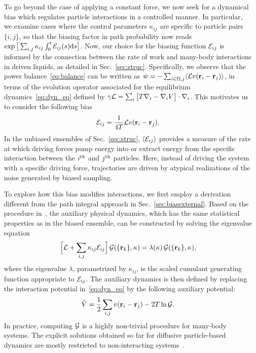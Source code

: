 \documentclass[superscriptaddress, twocolumn, prx, longbibliography, nofootinbib]{revtex4-1}
\begin{document}
To go beyond the case of applying a constant force, we now seek for a dynamical bias which regulates particle interactions in a controlled manner. In particular, we examine cases where the control parameters $\kappa_{ij}$ are specific to particle pairs $\{i,j\}$, so that the biasing factor in path probability now reads $\exp\big[\sum_{i,j}\kappa_{ij}\int_0^t{\cal E}_{ij}(s){\rm d}s\big]$. {Now}, our choice for the biasing function ${\cal E}_{ij}$ is informed by the connection between the rate of work and many-body interactions in driven liquids, as detailed in Sec.~\ref{sec:struc}. { Specifically, we observe that the power balance~\eqref{eq:balance} can be written as $\dot w = - \sum_{i\in\Omega,j} \langle{\cal L} v({\bf r}_i-{\bf r}_j)\rangle$, in terms of the evolution operator associated for the equilibrium dynamics~\eqref{eq:dyn_eq} defined by $\gamma{\cal L} = \sum_i\big[ T \nabla_i - \nabla_i V\big] \cdot\nabla_i $. This motivates us to consider the following bias}
\begin{equation}\label{eq:eps_bis}
	{\cal E}_{ij} = \frac{1}{4T} {\cal L} v({\bf r}_i-{\bf r}_j) .
\end{equation}
In the unbiased ensembles of Sec.~\ref{sec:struc}, $\langle {\cal E}_{ij} \rangle$ provides a measure of the rate at which driving forces pump energy into or extract energy from the specific interaction between the $i^{\rm th}$ and $j^{\rm th}$ particles. Here, instead of driving the system with a specific driving force, trajectories are driven by atypical realizations of the noise generated by biased sampling.



To explore how this bias modifies interactions, {we first employ a derivation different from the path integral approach in Sec.~\ref{sec:biasexternal}}. Based on the procedure in~\cite{Jack2010,Chetrite2013}, the auxiliary physical dynamics, which has the same statistical properties as in the biased ensemble, can be constructed by solving the eigenvalue equation 
\begin{equation}\label{eq:adjointbiased}
	\Big[ {\cal L} + \sum_{i,j}\kappa_{ij}{\cal E}_{ij} \Big]\,{\cal G}(\{{\bf r}_k\},\kappa) = \lambda(\kappa)\,{\cal G}(\{{\bf r}_k\},\kappa) ,
\end{equation}
where the eigenvalue $\lambda$, parametrized by $\kappa_{ij}$, is the scaled cumulant generating function appropriate to ${\cal E}_{ij}$. The auxiliary dynamics is then defined by replacing the interaction potential in~\eqref{eq:dyn_eq} by the following auxiliary potential:
\begin{equation} \label{eq:auxiliary}
	\tilde V = \frac{1}{2}\sum_{i,j} v({\bf r}_i-{\bf r}_j) - 2 T \ln{\cal G} .
\end{equation}
In practice, computing $\cal G$ is a highly non-trivial procedure for many-body systems. The explicit solutions obtained so far for diffusive particle-based dynamics are mostly restricted to non-interacting systems~\cite{Chetrite2013, Touchette2016}.
\end{document}

